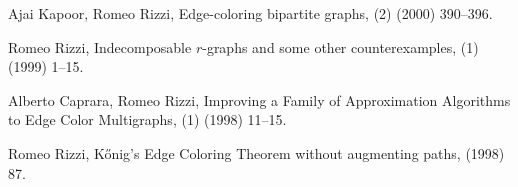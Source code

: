 \begin{etaremune}
  \item {\sc Ajai Kapoor, Romeo Rizzi},
   \newblock  Edge-coloring bipartite graphs,
   (2) (2000) 390--396.

  \item {\sc Romeo Rizzi},
   \newblock  Indecomposable $r$-graphs and some other counterexamples,
   (1) (1999) 1--15.

  \item {\sc Alberto Caprara, Romeo Rizzi},  
   \newblock  Improving a Family of Approximation
              Algorithms to Edge Color Multigraphs,
   (1) (1998) 11--15.

  \item {\sc Romeo Rizzi},
   \newblock  K\H{o}nig's Edge Coloring Theorem without augmenting paths,
    (1998) 87.

\end{etaremune}

